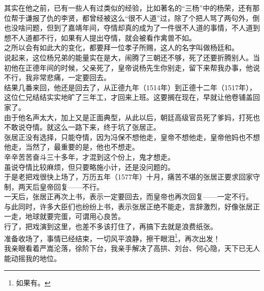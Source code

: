 \begin{multicols}{\theparacolNo}
其实在他之前，已有一些人有过类似的经验，比如著名的“三杨”中的杨荣，还有那位帮于谦报了仇的李贤，都曾经被这么“很不人道”过，除了个把人骂了两句外，倒也没啥问题，但到了嘉靖年间，夺情却真的成为了一件很不人道的事情，不人道到想不人道都不行，如果有人提出夺情，就会被看作禽兽不如。\\

之所以会有如此大的变化，都要拜一位孝子所赐，这人的名字叫做杨廷和。\\

说起来，这位杨兄弟的能量实在是大，闹腾了三朝还不够，死了还要折腾别人。当初他在正德年间的时候，父亲死了，皇帝说杨先生你别走，留下来帮我办事，他说不行，我非常悲痛，一定要回去。\\

结果几番来回，他还是回去了，从正德九年（1514年）到正德十二年（1517年），这位仁兄结结实实地旷了三年工，才回来上班。这要搁在现在，早就让他卷铺盖回家了。\\

由于他名声太大，加上又是正面典型，从此以后，朝廷高级官员死了爹妈，打死也不敢说夺情。就这么一路下来，终于坑了张居正。\\

张居正没有选择，只能夺情，因为冯保不想他走，皇帝不想他走，皇帝他妈也不想他走，当然了，最重要的是，他也不想走。\\

辛辛苦苦奋斗三十多年，才混到这个份上，鬼才想走。\\

虽说夺情比较麻烦，但只要略施小计，还是没问题的。\\

于是老把戏很快上场了，万历五年（1577年）十月，痛苦不堪的张居正要求回家守制，两天后皇帝回复——不行。\\

一天后，张居正再次上书，表示一定要回去，而皇帝也再次回复——一定不行。\\

与此同时，许多大臣们也纷纷上书，表示张居正绝不能走，言辞激烈，好像张居正一走，地球就要完蛋，可谓用心良苦。\\

行了，把戏演到这里，也差不多该打住了，再搞下去就是浪费纸张。\\

准备收场了，事情已经结束，一切风平浪静，擦干眼泪\footnote{如果有。}，再次出发！\\

我亲眼看着严嵩沦落，徐阶下台，我亲手解决了高拱、刘台、何心隐，天下已无人能动摇我的地位。\\


\end{multicols}
